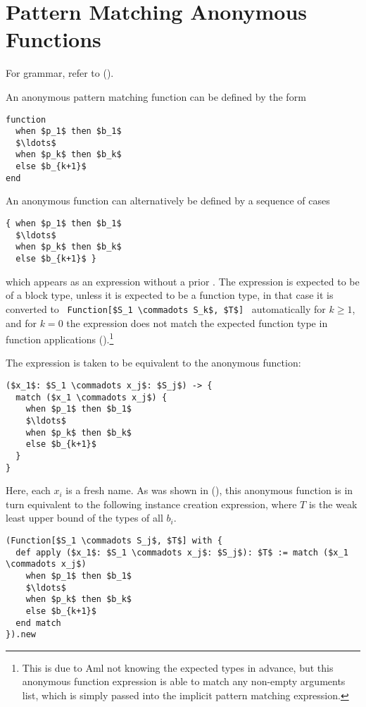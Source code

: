 \section{Pattern Matching Anonymous Functions}
\label{sec:pattern-matching-anon-fun}

For grammar, refer to ().

An anonymous pattern matching function can be defined by the form
\begin{lstlisting}
function 
  when $p_1$ then $b_1$ 
  $\ldots$ 
  when $p_k$ then $b_k$ 
  else $b_{k+1}$
end
\end{lstlisting}

An anonymous function can alternatively be defined by a sequence of cases
\begin{lstlisting}
{ when $p_1$ then $b_1$ 
  $\ldots$ 
  when $p_k$ then $b_k$ 
  else $b_{k+1}$ }
\end{lstlisting}
which appears as an expression without a prior . The expression is expected to be of a block type, unless it is expected to be a function type, in that case it is converted to ~\lstinline!Function[$S_1 \commadots S_k$, $T$]!~ automatically for $k \geq 1$, and for $k = 0$ the expression does not match the expected function type in function applications ().\footnote{This is due to Aml not knowing the expected types in advance, but this anonymous function expression is able to match any non-empty arguments list, which is simply passed into the implicit pattern matching expression.} 

The expression is taken to be equivalent to the anonymous function:
\begin{lstlisting}
($x_1$: $S_1 \commadots x_j$: $S_j$) -> {
  match ($x_1 \commadots x_j$) {
    when $p_1$ then $b_1$
    $\ldots$
    when $p_k$ then $b_k$
    else $b_{k+1}$
  }
}
\end{lstlisting}

Here, each $x_i$ is a fresh name. As was shown in (), this anonymous function is in turn equivalent to the following instance creation expression, where $T$ is the weak least upper bound of the types of all $b_i$. 

\begin{lstlisting}
(Function[$S_1 \commadots S_j$, $T$] with {
  def apply ($x_1$: $S_1 \commadots x_j$: $S_j$): $T$ := match ($x_1 \commadots x_j$)
    when $p_1$ then $b_1$
    $\ldots$
    when $p_k$ then $b_k$
    else $b_{k+1}$
  end match
}).new
\end{lstlisting}

